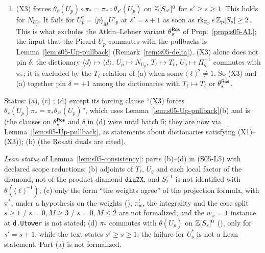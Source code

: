 \begin{lemma}
\begin{enumerate}[label=(\alph*)]
  Prop.~\ref{prop:s01-adjoint}(c) (factor $2$ of (F2)). Under (X2) and (X3), the $u$-adjoint of $\beta_{s's}$ is
  $\varphi_{s'}^{-1}\circ\pi^!_w\circ\varphi_s$.
\item (X3) forces $\theta_s(U_p)\circ\pi_*=\pi_*\circ\theta_{s'}(U_p)$ on $\mathbb{Z}[S_{s'}]^0$ for $s'\ge s\ge1$. This holds for $N_{U_p}$. It fails
  for $U_p^*=\langle p\rangle_MU'_p$ at $s'=s+1$ as soon as $\operatorname{rk}_{\mathbb{Z}_p}e\,\mathbb{Z}_p[S_s]\ge2$. This is what excludes the Atkin--Lehner variant
  $\theta_s^{\mathsf{Ros}}$ of Prop.~\ref{prop:s05-AL}; the input that the Picard $U_p$ commutes with the pullbacks is Lemma~\ref{lem:s05-Up-pullback}
  (Remark~\ref{rem:s05-delta}). (X3) alone does not pin $\delta$: the dictionary $\langle d\rangle\mapsto\langle d\rangle$, $U_p\mapsto N_{U_p}$, $T_\ell\mapsto T_\ell$,
  $U_q\mapsto\Pi_q^{-1}$ commutes with $\pi_*$; it is excluded by the $T_\ell$-relation of (a) when some $\langle\ell\rangle^2\ne1$. So (X3) and (a)
  together pin $\delta=+1$ among the dictionaries with $T_\ell\mapsto T_\ell$ or $\theta^{\mathsf{Ros}}_s$.
\end{enumerate}
Status: (a), (c) \stproved{}; (d) \stproved{} except its forcing clause ``(X3) forces $\theta_s(U_p)\pi_*=\pi_*\theta_{s'}(U_p)$'', which uses Lemma~\ref{lem:s05-Up-pullback}(b) and is \stpmc{} (the clauses on $\theta^{\mathsf{Ros}}_s$ and $\delta$ in (d) were \stexp{} until batch 5; they are now \stpmc{}
via Lemma~\ref{lem:s05-Up-pullback}, as statements about dictionaries satisfying (X1)--(X3)); (b) \stpmc{} (the Rosati duals are cited).
\end{lemma}
\noindent\emph{Lean status} of Lemma~\ref{lem:s05-consistency}: parts (b)--(d) \stformal{} in  (S05-L5) with declared scope reductions: (b) adjoints of $T_\ell$, $U_q$ and each local factor of the diamond, not of the product diamond $\mathtt{diaZX}$, and $S_\ell^{-1}$ is not identified with $\theta(\langle\ell\rangle^{-1})$; (c) only the form ``the weights agree'' of the projection formula, with $\pi^*$, under a hypothesis on the weights (); $\pi^!_w$, the integrality and the case split $s\ge1$ / $s=0,M\ge3$ / $s=0,M\le2$ are not formalized, and the $w_x=1$ instance at \texttt{d.Utower} is not stated; (d) $\pi_*$ commutes with $\theta(U_p)$ on $\mathbb{Z}[S_s]^0$ (), only for $s'=s+1$, while the text states $s'\ge s\ge1$; the failure for $U_p^*$ is not a Lean statement. Part (a) is not formalized.
